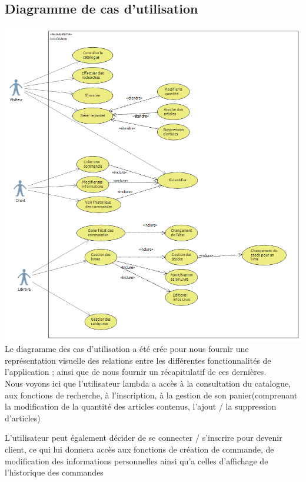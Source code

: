 	\subsection{Diagramme de cas d'utilisation}
	\includegraphics[scale=0.4]{Res/useCase.png}
	Le diagramme des cas d'utilisation a été crée pour nous fournir une représentation visuelle des relations entre les différentes fonctionnalités de l'application ; ainsi que de nous fournir un récapitulatif de ces dernières. \\

	Nous voyons ici que l'utilisateur lambda a accès à la consultation du catalogue, aux fonctions de recherche, à l'inscription, à la gestion de son panier(comprenant la modification de la quantité des articles contenus, l'ajout / la suppression d'articles)

	L'utilisateur peut également décider de se connecter / s'inscrire pour devenir client, ce qui lui donnera accès aux fonctions de création de commande, de modification des informations personnelles ainsi qu'a celles d’affichage de l'historique des commandes

	\clearpage
